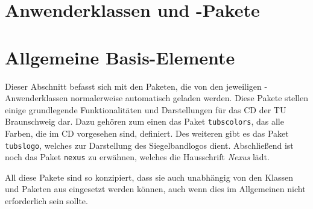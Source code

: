 


\tableofcontents


\newcommand{\newdocumentclass}[1]{\textcolor{tuGreenDark}{\lstinline!#1!}}
\newcommand{\newpackage}[1]{\textcolor{tuGreenDark}{\lstinline{#1}}}





\part{Anwenderklassen und -Pakete}\label{part:user}







\part{Allgemeine Basis-Elemente}\label{part:base}

Dieser Abschnitt befasst sich mit den Paketen, die von den jeweiligen
\tubslatex-Anwender\-klassen normalerweise automatisch geladen werden.
Diese Pakete stellen einige grundlegende Funktionalitäten und Darstellungen
für das \acs{CD} der TU Braunschweig dar. Dazu gehören zum einen das Paket
\newpackage{tubscolors}, das alle Farben, die im \acs{CD} vorgesehen sind,
definiert. Des weiteren gibt es das Paket \newpackage{tubslogo}, welches
zur Darstellung des Siegelbandlogos dient. Abschließend ist noch das Paket
\newpackage{nexus} zu erwähnen, welches die Hausschrift \emph{Nexus}
lädt.

All diese Pakete sind so konzipiert, dass sie auch unabhängig von den
Klassen und Paketen aus \tubslatex eingesetzt werden können, auch wenn dies
im Allgemeinen nicht erforderlich sein sollte.

